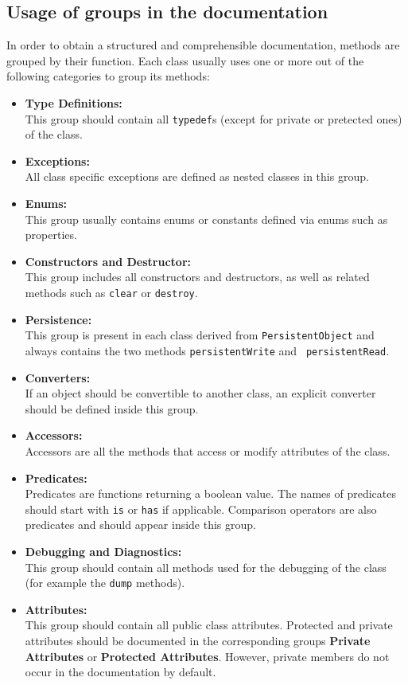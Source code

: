 \documentclass[a4paper,10pt]{article}
\begin{document}
\subsection{Usage of groups in the documentation}

In order to obtain a structured and comprehensible documentation,  methods are
grouped by their function. Each class usually uses one or more out of the
following categories to group its methods:
\begin{itemize}
	\item {\bf Type Definitions:}\\
		This group should contain all {\tt typedef}s (except for private or pretected
		ones) of the class.
	\item {\bf Exceptions:}\\
		All class specific exceptions are defined as nested classes in this group.
	\item {\bf Enums:}\\
		This group usually contains enums or constants defined via enums such as
		properties.
	\item {\bf Constructors and Destructor:}\\
		This group includes all constructors and destructors, as well as related
		methods such as {\tt clear} or {\tt destroy}.
	\item {\bf Persistence:}\\
		This group is present in each class derived from {\tt PersistentObject}
		and always contains the two methods {\tt persistentWrite} and {\tt
		persistentRead}.
	\item {\bf Converters:}\\
		If an object should be convertible to another class, an explicit
		converter should be defined inside this group.
	\item {\bf Accessors:}\\
		Accessors are all the methods that access or modify attributes of the
		class.
	\item {\bf Predicates:}\\
		Predicates are functions returning a boolean value. The names of
		predicates should start with {\tt is} or {\tt has} if applicable.
		Comparison operators are also predicates and should appear inside
		this group.
	\item {\bf Debugging and Diagnostics:}\\
		This group should contain all methods used for the debugging of the class
		(for example the {\tt dump} methods).
	\item {\bf Attributes:}\\	
		This group should contain all public class attributes. Protected and
		private attributes should be documented in the corresponding groups
		{\bf Private Attributes} or {\bf Protected Attributes}. However, private 
		members do not occur in the documentation by default.
\end{itemize}
\end{document}
